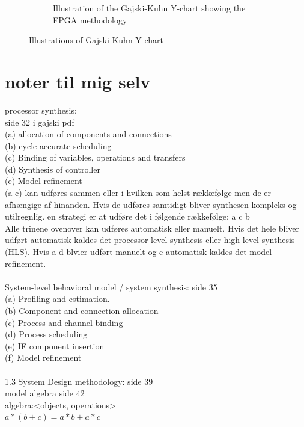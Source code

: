 \begin{figure}[ht]
\begin{subfigure}[t]{0.475\textwidth}
    \caption{Illustration of the Gajski-Kuhn Y-chart showing the FPGA methodology \cite{gajski2009}  \label{fig:ychart_fpga}}
  \end{subfigure}\hspace{0.5cm}
  \caption{Illustrations of Gajski-Kuhn Y-chart\label{fig:ychartall}}
\end{figure}

\color{gray}
\section*{noter til mig selv}
processor synthesis:\\
side 32 i gajski pdf \\
(a) allocation of components and connections \\
(b) cycle-accurate scheduling\\
(c) Binding of variables, operations and transfers\\
(d) Synthesis of controller\\
(e) Model refinement\\
(a-c) kan udføres sammen eller i hvilken som helst rækkefølge men de er afhængige af hinanden. Hvis de udføres samtidigt bliver synthesen kompleks og utilregnlig. en strategi er at udføre det i følgende rækkefølge: a c b\\
Alle trinene ovenover kan udføres automatisk eller manuelt. Hvis det hele bliver udført automatisk kaldes det processor-level synthesis eller high-level synthesis (HLS).  Hvis a-d blvier udført manuelt og e automatisk kaldes det model refinement.\\
\\
System-level behavioral model / system synthesis: side 35\\
(a) Profiling and estimation. \\
(b) Component and connection allocation\\
(c) Process and channel binding\\
(d) Process scheduling\\
(e) IF component insertion\\
(f) Model refinement\\
\\
1.3 System Design methodology: side 39 \\
model algebra side 42\\
algebra:<objects, operations>\\
$a*(b+c) = a*b+a*c$\\
